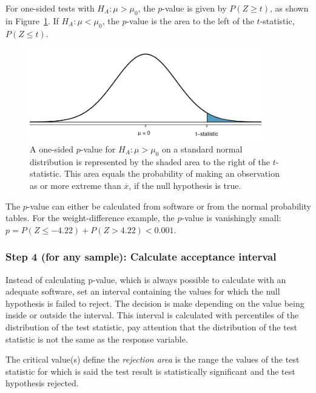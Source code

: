 For one-sided tests with $H_A: \mu > \mu_0$, the $p$-value is given by $P(Z \geq t)$, as shown in Figure~\ref{pValueOneSided}. If $H_A: \mu < \mu_0$, the $p$-value is the area to the left of the $t$-statistic, $P(Z \leq t)$.

\begin{figure}[h]
	\centering
	\includegraphics[width=0.9\textwidth]{ch_05a_inference_foundations_oi_biostat/figures/pValueOneSided/pValueOneSided}
	\caption{A one-sided $p$-value for $H_A: \mu > \mu_0$ on a standard normal distribution is represented by the shaded area to the right of the $t$-statistic. This area equals the probability of making an observation as or more extreme than $\overline{x}$, if the null hypothesis is true.}
	\label{pValueOneSided}
\end{figure}


The $p$-value can either be calculated from software or from the normal probability tables. For the weight-difference example, the $p$-value is vanishingly small: $p = P(Z \leq - 4.22) + P(Z > 4.22)< 0.001$.



\subsubsection{Step 4 (for any sample): Calculate acceptance interval}

Instead of calculating p-value, which is always possible to calculate with an adequate software, set an interval containing the values for which the null hypothesis is failed to reject. The decision is make depending on the value being inside or outside the interval. This interval is calculated with percentiles of the distribution of the test statistic, pay attention that the distribution of the test statistic is not the same as the response variable. 

The critical value(s) define the
    \emph{rejection area} is the range the values of the test
    statistic for which is said the test result is statistically
    significant and the test hypothesis rejected.

